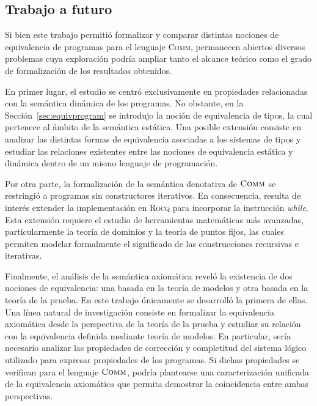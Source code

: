 \subsection{Trabajo a futuro}

Si bien este trabajo permitió formalizar y comparar distintas nociones de equivalencia de programas para el lenguaje \textsc{Comm}, permanecen abiertos diversos problemas cuya exploración podría ampliar tanto el alcance teórico como el grado de formalización de los resultados obtenidos.

En primer lugar, el estudio se centró exclusivamente en propiedades relacionadas con la semántica dinámica de los programas. No obstante, en la Sección~\ref{sec:equivprogram} se introdujo la noción de equivalencia de tipos, la cual pertenece al ámbito de la semántica estática. Una posible extensión consiste en analizar las distintas formas de equivalencia asociadas a los sistemas de tipos y estudiar las relaciones existentes entre las nociones de equivalencia estática y dinámica dentro de un mismo lenguaje de programación.

Por otra parte, la formalización de la semántica denotativa de $\textsc{Comm}$ se restringió a programas sin constructores iterativos. En consecuencia, resulta de interés extender la implementación en \textsc{Rocq} para incorporar la instrucción \textit{while}. Esta extensión requiere el estudio de herramientas matemáticas más avanzadas, particularmente la teoría de dominios y la teoría de puntos fijos, las cuales permiten modelar formalmente el significado de las construcciones recursivas e iterativas.

Finalmente, el análisis de la semántica axiomática reveló la existencia de dos nociones de equivalencia: una basada en la teoría de modelos y otra basada en la teoría de la prueba. En este trabajo únicamente se desarrolló la primera de ellas. Una línea natural de investigación consiste en formalizar la equivalencia axiomática desde la perspectiva de la teoría de la prueba y estudiar su relación con la equivalencia definida mediante teoría de modelos. En particular, sería necesario analizar las propiedades de corrección y completitud del sistema lógico utilizado para expresar propiedades de los programas. Si dichas propiedades se verifican para el lenguaje $\textsc{Comm}$, podría plantearse una caracterización unificada de la equivalencia axiomática que permita demostrar la coincidencia entre ambas perspectivas.